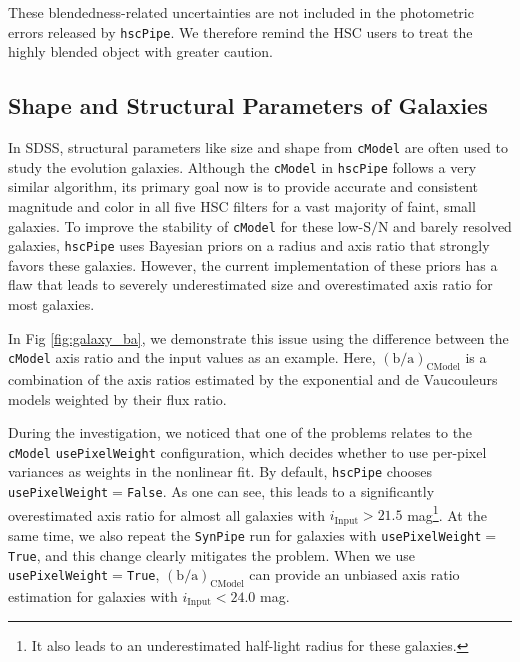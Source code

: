 \documentclass[useamsfonts]{pasj01}
\def\hscpipe{\texttt{hscPipe}}
\def\synpipe{\texttt{SynPipe}}
\def\cmodel{\texttt{cModel}}
\def\s2n{{$\mathrm{S}/\mathrm{N}$}}
\newcommand{\plan}[1]{\textcolor{blue} {\textbf{#1}}}
\begin{document}
    These blendedness-related uncertainties are not included in the photometric errors released by \hscpipe{}.  
    We therefore remind the HSC users to treat the highly blended object with 
    greater caution.
    



\subsection{Shape and Structural Parameters of Galaxies}
    \label{ssec:shape}

    In SDSS,  structural parameters like size and shape from \cmodel{} are often 
    used to study the evolution galaxies. 
    Although the \cmodel{} in \hscpipe{} follows a very similar algorithm, its primary 
    goal now is to provide accurate and consistent magnitude and color in all five 
    HSC filters for a vast majority of faint, small galaxies.  
    To improve the stability of \cmodel{} for these low-\s2n{} and barely resolved 
    galaxies, \hscpipe{} uses Bayesian priors on a radius and axis ratio that strongly 
    favors these galaxies. 
    However, the current implementation of these priors has a flaw that leads to 
    severely underestimated size and overestimated axis ratio for most galaxies.  
    
    In Fig \ref{fig:galaxy_ba}, we demonstrate this issue using the difference between 
    the \cmodel{} axis ratio and the input values as an example.
    Here, $({\mathrm{b}/\mathrm{a}})_{\mathrm{CModel}}$ is a combination of the 
    axis ratios estimated by the exponential and de Vaucouleurs models weighted by their flux ratio. 
    
    During the investigation, we noticed that one of the problems relates to the \cmodel{} \texttt{usePixelWeight} configuration, which decides whether to 
    use per-pixel variances as weights in the nonlinear fit. 
    By default, \hscpipe{} chooses \texttt{usePixelWeight}$=$\texttt{False}. 
    As one can see, this leads to a significantly overestimated axis ratio for almost 
    all galaxies with $i_{\mathrm{Input}}>21.5$ mag\footnote{It also leads to an
    underestimated half-light radius for these galaxies.}.
    At the same time, we also repeat the \synpipe{} run for galaxies with 
    \texttt{usePixelWeight}$=$\texttt{True}, and this change clearly mitigates
    the problem. When we use \texttt{usePixelWeight}$=$\texttt{True},
     $({\mathrm{b}/\mathrm{a}})_{\mathrm{CModel}}$ can provide an unbiased axis ratio estimation 
    for galaxies with $i_{\mathrm{Input}}< 24.0$ mag. 
    
\end{document}
